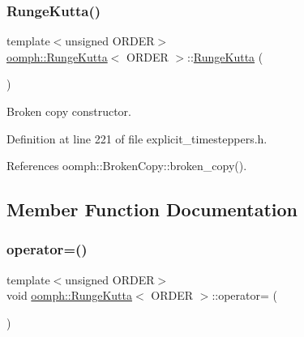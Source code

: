 \mbox{\label{classoomph_1_1RungeKutta_a26001afd775b24e25043fb0a2d449248}} 
\subsubsection{\texorpdfstring{Runge\+Kutta()}{RungeKutta()}\hspace{0.1cm}{\footnotesize\ttfamily [2/2]}}
{\footnotesize\ttfamily template$<$unsigned O\+R\+D\+ER$>$ \\
\hyperlink{classoomph_1_1RungeKutta}{oomph\+::\+Runge\+Kutta}$<$ O\+R\+D\+ER $>$\+::\hyperlink{classoomph_1_1RungeKutta}{Runge\+Kutta} (\begin{DoxyParamCaption}\item[{const \hyperlink{classoomph_1_1RungeKutta}{Runge\+Kutta}$<$ O\+R\+D\+ER $>$ \&}]{ }\end{DoxyParamCaption})\hspace{0.3cm}{\ttfamily [inline]}}



Broken copy constructor. 



Definition at line 221 of file explicit\+\_\+timesteppers.\+h.



References oomph\+::\+Broken\+Copy\+::broken\+\_\+copy().



\subsection{Member Function Documentation}
\mbox{\label{classoomph_1_1RungeKutta_a06cc882a44817b7c894b3e7dc04fc79e}} 
\subsubsection{\texorpdfstring{operator=()}{operator=()}}
{\footnotesize\ttfamily template$<$unsigned O\+R\+D\+ER$>$ \\
void \hyperlink{classoomph_1_1RungeKutta}{oomph\+::\+Runge\+Kutta}$<$ O\+R\+D\+ER $>$\+::operator= (\begin{DoxyParamCaption}\item[{const \hyperlink{classoomph_1_1RungeKutta}{Runge\+Kutta}$<$ O\+R\+D\+ER $>$ \&}]{ }\end{DoxyParamCaption})\hspace{0.3cm}{\ttfamily [inline]}}



